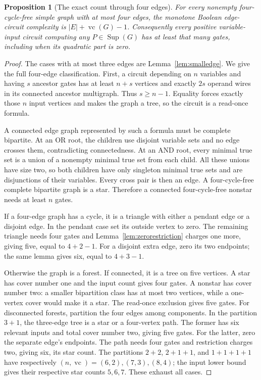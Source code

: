 \documentclass[11pt]{article}
\newcommand{\Sup}{\operatorname{Sup}}
\newcommand{\vc}{\operatorname{vc}}
\newtheorem{proposition}[theorem]{Proposition}
\theoremstyle{definition}
\theoremstyle{remark}
\begin{document}
\begin{proposition}[The exact count through four edges]\label{prop:fouredgeboundary}
For every nonempty four-cycle-free simple graph with at most four edges, the monotone Boolean edge-circuit complexity is $|E|+\vc(G)-1$. Consequently every positive variable-input circuit computing any $P\in\Sup(G)$ has at least that many gates, including when its quadratic part is zero.
\end{proposition}
\begin{proof}
The cases with at most three edges are Lemma~\ref{lem:smalledge}. We give the full four-edge classification. First, a circuit depending on $n$ variables and having $s$ ancestor gates has at least $n+s$ vertices and exactly $2s$ operand wires in its connected ancestor multigraph. Thus $s\ge n-1$. Equality forces exactly those $n$ input vertices and makes the graph a tree, so the circuit is a read-once formula.

A connected edge graph represented by such a formula must be complete bipartite. At an OR root, the children use disjoint variable sets and no edge crosses them, contradicting connectedness. At an AND root, every minimal true set is a union of a nonempty minimal true set from each child. All these unions have size two, so both children have only singleton minimal true sets and are disjunctions of their variables. Every cross pair is then an edge. A four-cycle-free complete bipartite graph is a star. Therefore a connected four-cycle-free nonstar needs at least $n$ gates.

If a four-edge graph has a cycle, it is a triangle with either a pendant edge or a disjoint edge. In the pendant case set its outside vertex to zero. The remaining triangle needs four gates and Lemma~\ref{lem:zerorestriction} charges one more, giving five, equal to $4+2-1$. For a disjoint extra edge, zero its two endpoints; the same lemma gives six, equal to $4+3-1$.

Otherwise the graph is a forest. If connected, it is a tree on five vertices. A star has cover number one and the input count gives four gates. A nonstar has cover number two: a smaller bipartition class has at most two vertices, while a one-vertex cover would make it a star. The read-once exclusion gives five gates. For disconnected forests, partition the four edges among components. In the partition $3+1$, the three-edge tree is a star or a four-vertex path. The former has six relevant inputs and total cover number two, giving five gates. For the latter, zero the separate edge's endpoints. The path needs four gates and restriction charges two, giving six, its star count. The partitions $2+2$, $2+1+1$, and $1+1+1+1$ have respectively $(n,\vc)=(6,2),(7,3),(8,4)$; the input lower bound gives their respective star counts $5,6,7$. These exhaust all cases.


\end{proof}
\end{document}
